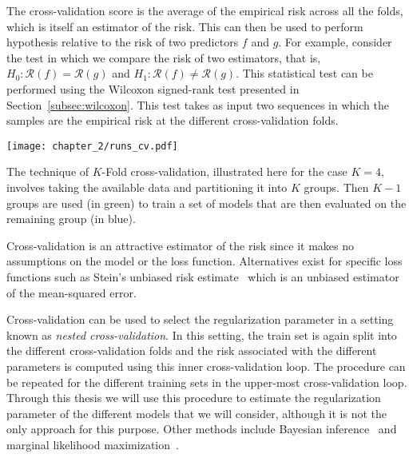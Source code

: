 The cross-validation score is the average of the empirical risk across all the folds, which is itself an estimator of the risk. This can then be used to perform hypothesis relative to the risk of two predictors $f$ and $g$. For example, consider the test in which we compare the risk of two estimators, that is, $H_0: \mathcal{R}(f) = \mathcal{R}(g)$ and $H_1: \mathcal{R}(f) \neq \mathcal{R}(g)$. This statistical test can be performed using the Wilcoxon signed-rank test presented in Section~\ref{subsec:wilcoxon}. This test takes as input two sequences 
in which the samples are the empirical risk at the different cross-validation folds.

\begin{marginfigure}
\hspace{-10pt}\texttt{[image: chapter\_2/runs\_cv.pdf]}
\caption{
	The technique of $K$-Fold cross-validation, illustrated here for the case $K = 4$, involves taking the available data and partitioning it into $K$ groups. Then $K-1$ groups are used (in green) to train a set of models that are then evaluated on the remaining group (in blue). 
}\label{fig:k_fold_cv}
\end{marginfigure}
Cross-validation is an attractive estimator of the risk since it makes no assumptions on the model or the loss function. Alternatives exist for specific loss functions such as Stein's unbiased risk estimate~\citep{stein1981estimation, donoho1995adapting} which is an unbiased estimator of the mean-squared error.

Cross-validation can be used to select the regularization parameter in a setting known as \emph{nested cross-validation}. In this setting, the train set is again split into the different cross-validation folds and the risk associated with the different parameters is computed using this inner cross-validation loop. The procedure can be repeated for the different training sets in the upper-most cross-validation loop. Through this thesis we will use this procedure to estimate the regularization parameter of the different models that we will consider, although it is not the only approach for this purpose. Other methods include Bayesian inference~\citep[Chapter 8 \& 10]{bishop2006pattern} and marginal likelihood maximization~\citep{bock1981marginal}.



